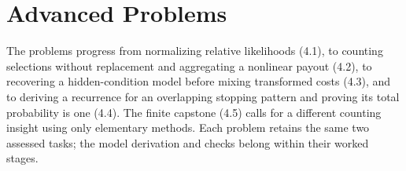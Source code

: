 \clearpage
\section{Advanced Problems}\label{sec:advanced}
The problems progress from normalizing relative likelihoods (4.1), to counting selections without replacement and aggregating a nonlinear payout (4.2), to recovering a hidden-condition model before mixing transformed costs (4.3), and to deriving a recurrence for an overlapping stopping pattern and proving its total probability is one (4.4). The finite capstone (4.5) calls for a different counting insight using only elementary methods. Each problem retains the same two assessed tasks; the model derivation and checks belong within their worked stages.

\clearpage
